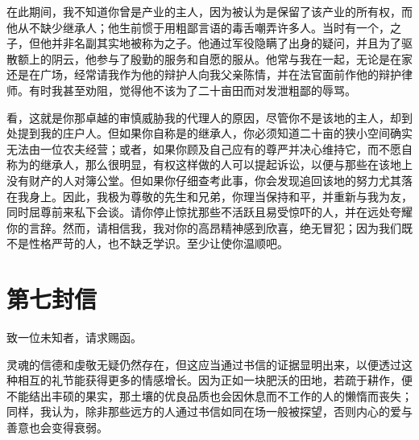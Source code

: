 在此期间，我不知道你曾是产业的主人，因为被认为是保留了该产业的所有权，而他从不缺少继承人；他生前惯于用粗鄙言语的毒舌嘲弄许多人。当时有一个，之子，但他并非名副其实地被称为之子。他通过军役隐瞒了出身的疑问，并且为了驱散额上的阴云，他参与了殷勤的服务和自愿的服从。他常与我在一起，无论是在家还是在广场，经常请我作为他的辩护人向我父亲陈情，并在法官面前作他的辩护律师。有时我甚至劝阻，觉得他不该为了二十亩田而对发泄粗鄙的辱骂。\par

看，这就是你那卓越的审慎威胁我的代理人的原因，尽管你不是该地的主人，却到处提到我的庄户人。但如果你自称是的继承人，你必须知道二十亩的狭小空间确实无法由一位农夫经营；或者，如果你顾及自己应有的尊严并决心维持它，而不愿自称为的继承人，那么很明显，有权这样做的人可以提起诉讼，以便与那些在该地上没有财产的人对簿公堂。但如果你仔细查考此事，你会发现追回该地的努力尤其落在我身上。因此，我极为尊敬的先生和兄弟，你理当保持和平，并重新与我为友，同时屈尊前来私下会谈。请你停止惊扰那些不活跃且易受惊吓的人，并在远处夸耀你的言辞。然而，请相信我，我对你的高昂精神感到欣喜，绝无冒犯；因为我们既不是性格严苛的人，也不缺乏学识。至少让使你温顺吧。\par


\section{第七封信}

致一位未知者，请求赐函。\par

灵魂的信德和虔敬无疑仍然存在，但这应当通过书信的证据显明出来，以便透过这种相互的礼节能获得更多的情感增长。因为正如一块肥沃的田地，若疏于耕作，便不能结出丰硕的果实，那土壤的优良品质也会因休息而不工作的人的懒惰而丧失；同样，我认为，除非那些远方的人通过书信如同在场一般被探望，否则内心的爱与善意也会变得衰弱。\par

